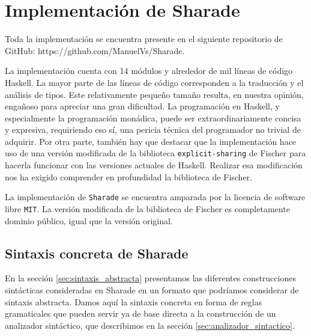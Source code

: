 \documentclass[class=article, crop=false]{standalone}
\begin{document}
\section{Implementación de Sharade}

Toda la implementación se encuentra presente en el siguiente repositorio de GitHub:
https://github.com/ManuelVs/Sharade.

La implementación cuenta con 14 módulos y alrededor de mil líneas de código Haskell. La mayor
parte de las líneas de código corresponden a la traducción y el análisis de tipos. Este
relativamente pequeño tamaño resulta, en nuestra opinión, engañoso para apreciar una gran
dificultad. La programación en Haskell, y especialmente la programación monádica, puede ser
extraordinariamente concisa y expresiva, requiriendo eso sí, una pericia técnica del
programador no trivial de adquirir. Por otra parte, también hay que destacar que la
implementación hace uso de una versión modificada de la biblioteca \verb`explicit-sharing` de
Fischer para hacerla funcionar con las versiones actuales de Haskell. Realizar esa
modificación nos ha exigido comprender en profundidad la biblioteca de Fischer.

La implementación de \verb`Sharade` se encuentra amparada por la licencia de software libre
\verb`MIT`. La versión modificada de la biblioteca de Fischer es completamente dominio
público, igual que la versión original.

\subsection{Sintaxis concreta de Sharade}\label{sec:sintaxis_concreta}

En la sección \ref{sec:sintaxis_abstracta} presentamos las diferentes construcciones
sintácticas consideradas en Sharade en un formato que podríamos considerar de sintaxis
abstracta. Damos aquí la sintaxis concreta  en forma de reglas gramaticales que pueden servir
ya de base directa a la construcción de un analizador sintáctico, que describimos en la
sección \ref{sec:analizador_sintactico}.
\end{document}
